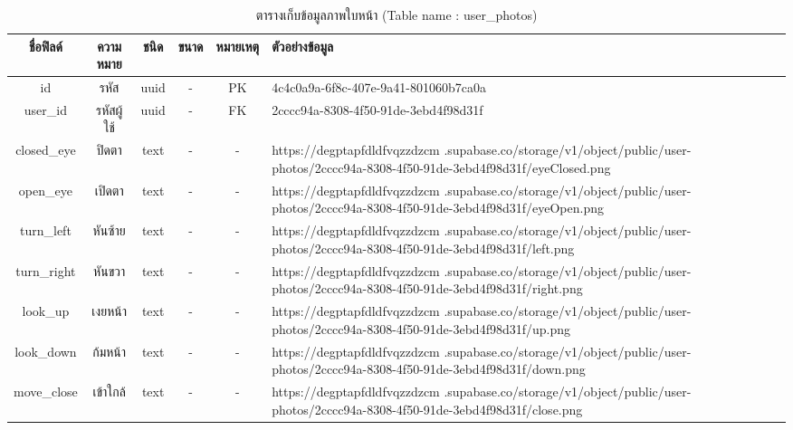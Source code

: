 \begin{table}[h!]
    \centering
    \caption{\fontSixTeen ตารางเก็บข้อมูลภาพใบหน้า (Table name : user\_photos)}
    \label{tab3:userphotos1}
    \fontSixTeen 
    \begin{tabularx}{\textwidth}{| c | c | c | c | c | X |} 
    \hline
    \textbf{ชื่อฟิลด์} & \textbf{ความหมาย} & \textbf{ชนิด} & \textbf{ขนาด} & \textbf{หมายเหตุ} & \textbf{ตัวอย่างข้อมูล} \\
    \hline
    id & รหัส & uuid & - & PK & 4c4c0a9a-6f8c-407e-9a41-801060b7ca0a \\
    \hline
    user\_id & รหัสผู้ใช้ & uuid & - & FK & 2cccc94a-8308-4f50-91de-3ebd4f98d31f \\
    \hline
    closed\_eye & ปิดตา & text & - & - & https://degptapfdldfvqzzdzcm .supabase.co/storage/v1/object/public/user-photos/2cccc94a-8308-4f50-91de-3ebd4f98d31f/eyeClosed.png \\
    \hline
    open\_eye & เปิดตา & text & - & - & https://degptapfdldfvqzzdzcm .supabase.co/storage/v1/object/public/user-photos/2cccc94a-8308-4f50-91de-3ebd4f98d31f/eyeOpen.png \\
    \hline
    turn\_left & หันซ้าย & text & - & - & https://degptapfdldfvqzzdzcm .supabase.co/storage/v1/object/public/user-photos/2cccc94a-8308-4f50-91de-3ebd4f98d31f/left.png \\
    \hline
    turn\_right & หันขวา & text & - & - & https://degptapfdldfvqzzdzcm .supabase.co/storage/v1/object/public/user-photos/2cccc94a-8308-4f50-91de-3ebd4f98d31f/right.png \\
    \hline
    look\_up & เงยหน้า & text & - & - & https://degptapfdldfvqzzdzcm .supabase.co/storage/v1/object/public/user-photos/2cccc94a-8308-4f50-91de-3ebd4f98d31f/up.png \\
    \hline
    look\_down & ก้มหน้า & text & - & - & https://degptapfdldfvqzzdzcm .supabase.co/storage/v1/object/public/user-photos/2cccc94a-8308-4f50-91de-3ebd4f98d31f/down.png \\
    \hline
    move\_close & เข้าใกล้ & text & - & - & https://degptapfdldfvqzzdzcm .supabase.co/storage/v1/object/public/user-photos/2cccc94a-8308-4f50-91de-3ebd4f98d31f/close.png \\
    \hline
    \end{tabularx}
\end{table}

